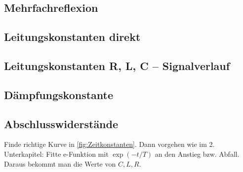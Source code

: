 \subsection{Mehrfachreflexion}

\clearpage
\subsection{Leitungskonstanten direkt}

\clearpage
\subsection{Leitungskonstanten R, L, C -- Signalverlauf}

\clearpage
\subsection{Dämpfungskonstante}

\clearpage
\subsection{Abschlusswiderstände}
Finde richtige Kurve in \ref{fig:Zeitkonstanten}. Dann vorgehen wie im 2. Unterkapitel: Fitte e-Funktion mit $\exp(-t/T)$ an den Anstieg bzw. Abfall. Daraus bekommt man die Werte von $C,L,R$.
\clearpage


